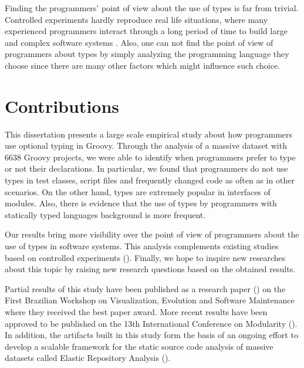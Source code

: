 \documentclass[msc]{ppgccufmg}
\begin{document}
Finding the programmers' point of view about the use of types is far from trivial.
Controlled experiments hardly reproduce real life situations, where many experienced programmers interact through a long period of time to build large and complex software systems \cite{Wohlin2012}.
Also, one can not find the point of view of programmers about types by simply analyzing the programming language they choose since there are many other factors which might influence such choice.




\section{Contributions}
This dissertation presents a large scale empirical study about how programmers use optional typing in Groovy.
Through the analysis of a massive dataset with 6638 Groovy projects, we were able to identify when programmers prefer to type or not their declarations. 
In particular, we found that programmers do not use types in test classes, script files and frequently changed code as often as in other scenarios.
On the other hand, types are extremely popular in interfaces of modules.
Also, there is evidence that the use of types by programmers with statically typed languages background is more frequent.

Our results bring more visibility over the point of view of programmers about the use of types in software systems.
This analysis complements existing studies based on controlled experiments (\cite{Hanenberg13, ruby_vs_druby, experiment_with_purity, hanenberg_icpc, mayer2012static, Gannon77, Prechelt98}).
Finally, we hope to inspire new researches about this topic by raising new research questions based on the obtained results.

Partial results of this study have been published as a research paper (\cite{souza_vem2013}) on the First Brazilian Workshop on Visualization, Evolution and Software Maintenance  where they received the best paper award.
More recent results have been approved to be published on the 13th International Conference on Modularity (\cite{souza_aosd2014}).
In addition, the artifacts built in this study form the basis of an ongoing effort to develop a scalable framework for the static source code analysis of massive datasets called Elastic Repository Analysis (\cite{era}).

\end{document}
